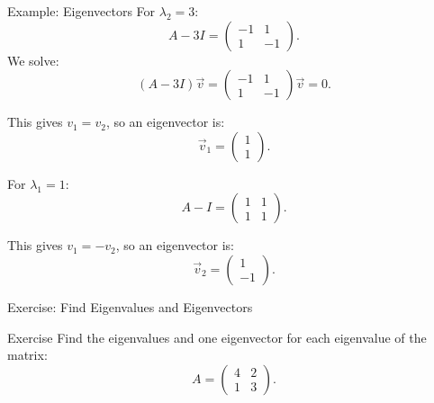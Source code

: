 \documentclass{beamer}
\begin{document}
	\begin{frame}{Example: Eigenvectors}
	For \(\lambda_2=3\):
		\begin{equation}
		A-3I =
		\begin{pmatrix} -1 & 1 \\ 1 & -1 \end{pmatrix}.
		\end{equation}
	We solve:
		\begin{equation}
		(A-3I)\vec{v} =
		\begin{pmatrix} -1 & 1 \\ 1 & -1 \end{pmatrix}
		\vec{v} =
		0.
		\end{equation}

	This gives \(v_1=v_2\), so an eigenvector is:
		\begin{equation}
		\vec{v}_1 =
		\begin{pmatrix}1\\1\end{pmatrix}.
		\end{equation}

	For \(\lambda_1=1\):
		\begin{equation}
		A-I =
		\begin{pmatrix}1 &1 \\1 &1\end{pmatrix}.
		\end{equation}

	This gives \(v_1=-v_2\), so an eigenvector is:
		\begin{equation}
		\vec{v}_2 =
		\begin{pmatrix}1\\-1\end{pmatrix}.
		\end{equation}
	\end{frame}

	\begin{frame}{Exercise: Find Eigenvalues and Eigenvectors}
		\begin{block}{Exercise}
		Find the eigenvalues and one eigenvector for each eigenvalue of the matrix:
			\begin{equation}
			A =
			\begin{pmatrix} 4 & 2 \\ 1 & 3 \end{pmatrix}.
			\end{equation}
		\end{block}
	\end{frame}
\end{document}
